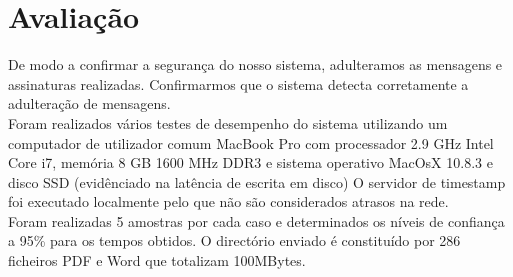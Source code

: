 \newpage
\chapter{Avaliação}
\label{chapter:evaluation}
De modo a confirmar a segurança do nosso sistema, adulteramos as mensagens e 
assinaturas realizadas. Confirmarmos que o sistema detecta corretamente a adulteração de mensagens. 
\\
Foram realizados vários testes de desempenho do sistema utilizando um computador de utilizador comum MacBook Pro com processador 2.9 GHz Intel Core i7, memória 8 GB 1600 MHz DDR3 e sistema operativo MacOsX 10.8.3 e disco SSD (evidênciado na latência de escrita em disco) O servidor de timestamp foi executado localmente pelo que não são considerados atrasos na rede.\\
Foram realizadas 5 amostras por cada caso e determinados os níveis de confiança a 95\% para os tempos obtidos. O directório enviado é constituído por  286 ficheiros PDF e Word que totalizam 100MBytes. \\
